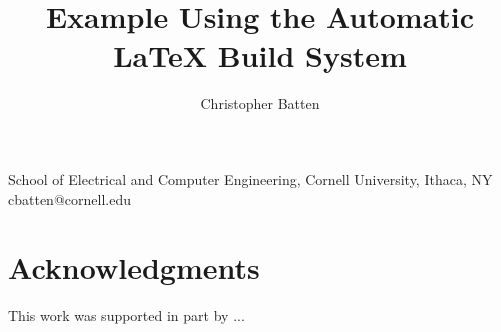 \documentclass{cbxreport}
\begin{document}

\title
{%
  Example Using the Automatic LaTeX Build System
}

\author
{%
  Christopher Batten
}

\institution
{%
  School of Electrical and Computer Engineering,
  Cornell University, Ithaca, NY \\
  cbatten@cornell.edu
}

\maketitle











\section*{Acknowledgments}

This work was supported in part by ...



\end{document}
